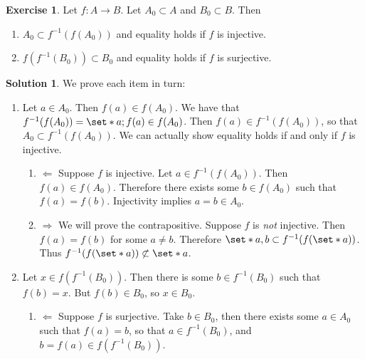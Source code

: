 \documentclass[11pt]{article}
\numberwithin{equation}{section}
\theoremstyle{plain}
\theoremstyle{definition}
\newtheorem*{solution}{\color{Goldenrod}Solution}
\newtheorem{exercise}{\color{YellowOrange}Exercise}[section]
\newcommand\inv[1]{#1^{-1}}
\def\Set{\set*}%
\def\imp{\Rightarrow}
\def\pmi{\Leftarrow}
\newcommand{\1}{\mathbbm 1}
\begin{document}
\begin{exercise}
 Let $f : A \to B$. Let $A_0 \subset A$ and $B_0 \subset B$. Then
 \begin{enumerate}
  	\item $A_0 \subset \inv{f}(f(A_0))$ and equality holds if $f$ is injective.
  	\item $f(\inv{f}(B_0)) \subset B_0$ and equality holds if $f$ is surjective.
  \end{enumerate} 
\end{exercise}
\begin{solution} We prove each item in turn:
\begin{enumerate}
	\item Let $a \in A_0$. Then $f(a) \in f(A_0)$. We have that $\inv{f}(f(A_0)) = \Set{a;f(a) \in f(A_0)}$. Then $f(a) \in \inv{f}(f(A_0))$, so that $A_0 \subset \inv{f}(f(A_0))$. We can actually show equality holds if and only if $f$ is injective. 
	\begin{enumerate}
		\item $\pmi$ Suppose $f$ is injective. Let $a \in \inv{f}(f(A_0))$. Then $f(a) \in f(A_0)$. Therefore there exists some $b \in f(A_0)$ such that $f(a) = f(b)$. Injectivity implies $a=b \in A_0$. 
		\item $\imp$ We will prove the contrapositive. Suppose $f$ is \emph{not} injective. Then $f(a) = f(b)$ for some $a \neq b$. Therefore $\Set{a,b} \subset \inv{f}(f(\Set{a}))$. Thus $\inv{f}(f(\Set{a})) \not\subset \Set{a}$.
	\end{enumerate}
	\item Let $x \in f(\inv{f}(B_0))$. Then there is some $b \in \inv{f}(B_0)$ such that $f(b) = x$. But $f(b) \in B_0$, so $x \in B_0$.
	\begin{enumerate}
		\item $\pmi$ Suppose $f$ is surjective. Take $b \in B_0$, then there exists some $a \in A_0$ such that $f(a) = b$, so that $a \in \inv{f}(B_0)$, and $b=f(a) \in f(\inv{f}(B_0))$. 
	\end{enumerate}
\end{enumerate}
\end{solution}
\end{document}
